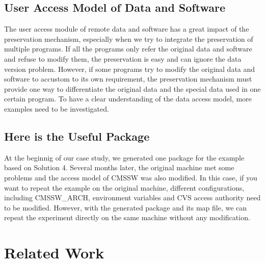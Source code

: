 \documentclass{sig-alternate}
\begin{document}
\subsection{User Access Model of Data and Software}

The user access module of remote data
and software has a great impact of the preservation mechanism, especially when
we try to integrate the preservation of multiple programs. If all the programs
only refer the original data and software and refuse to modify them, the
preservation is easy and can ignore the data version problem. However, if some
programs try to modify the original data and software to accustom to its own
requirement, the preservation mechanism must provide one way to differentiate
the original data and the special data used in one certain
program. To have a clear understanding of the data access model, more examples
need to be investigated.

\subsection{Here is the Useful Package}

At the beginnig of our case study, we generated one package for the
example based on Solution 4. Several months later, the original machine met
some problems and the access model of CMSSW was also modified. In this case, if
you want to repeat the example on the original machine, different 
configurations, including CMSSW\_ARCH, environment variables and CVS access
authority need to be modified. However, with the generated package and its map file, we can repeat the experiment directly on the same machine without any modification.

\section{Related Work }
\end{document}
